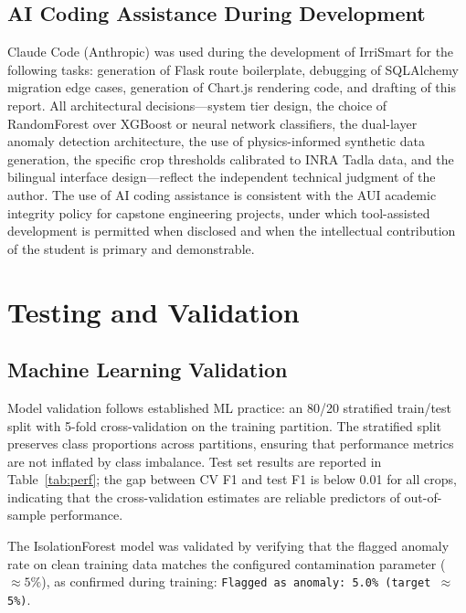 \documentclass[12pt,a4paper]{report}
\begin{document}
\section{AI Coding Assistance During Development}

Claude Code (Anthropic) was used during the development of IrriSmart for the following tasks: generation of Flask route boilerplate, debugging of SQLAlchemy migration edge cases, generation of Chart.js rendering code, and drafting of this report. All architectural decisions---system tier design, the choice of RandomForest over XGBoost or neural network classifiers, the dual-layer anomaly detection architecture, the use of physics-informed synthetic data generation, the specific crop thresholds calibrated to INRA Tadla data, and the bilingual interface design---reflect the independent technical judgment of the author. The use of AI coding assistance is consistent with the AUI academic integrity policy for capstone engineering projects, under which tool-assisted development is permitted when disclosed and when the intellectual contribution of the student is primary and demonstrable.

\chapter{Testing and Validation}

\section{Machine Learning Validation}

Model validation follows established ML practice: an 80/20 stratified train/test split with 5-fold cross-validation on the training partition. The stratified split preserves class proportions across partitions, ensuring that performance metrics are not inflated by class imbalance. Test set results are reported in Table~\ref{tab:perf}; the gap between CV F1 and test F1 is below 0.01 for all crops, indicating that the cross-validation estimates are reliable predictors of out-of-sample performance.

The IsolationForest model was validated by verifying that the flagged anomaly rate on clean training data matches the configured contamination parameter ($\approx 5\%$), as confirmed during training: \texttt{Flagged as anomaly: 5.0\% (target $\approx$ 5\%)}.
\end{document}

